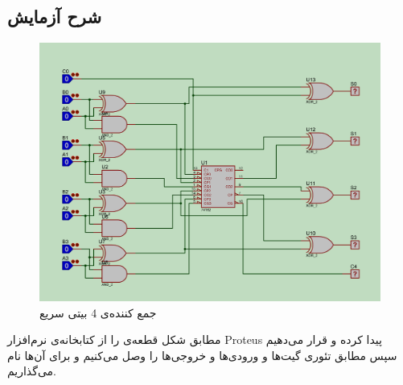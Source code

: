 \subsection*{شرح آزمایش}
\begin{figure}[h]
\centering
\includegraphics[scale=0.09]{Results/FastAdder.png}
\caption{
جمع کننده‌ی 4 بیتی سریع
}
\end{figure}

مطابق شکل قطعه‌ی 
را از کتابخانه‌ی نرم‌افزار
Proteus
پیدا کرده و قرار می‌دهیم سپس مطابق تئوری گیت‌ها و ورودی‌ها و خروجی‌ها را وصل می‌کنیم و برای آن‌ها نام می‌گذاریم.

